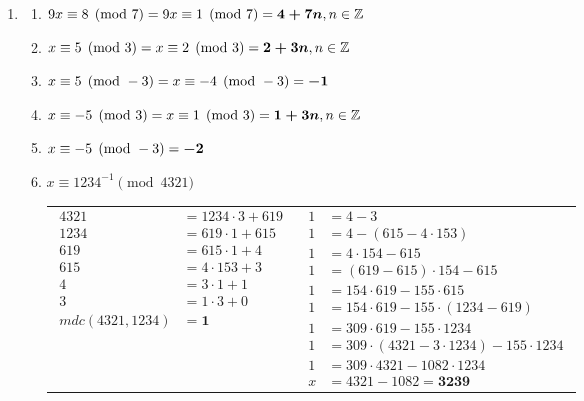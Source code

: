 \documentclass[fleqn]{article}
\begin{document}
\begin{enumerate}[label=\textbf{\arabic*})]
\begin{enumerate}
\end{enumerate}

\item

\begin{enumerate}

\item $9x \equiv 8 \pmod{7} \\
= 9x \equiv 1 \pmod{7} \\
= \boldsymbol{4 + 7n}, n \in \mathbb{Z}$

\item $x \equiv 5 \pmod{3} \\
= x \equiv 2 \pmod{3} \\
= \boldsymbol{2 + 3n}, n \in \mathbb{Z}$

\item $x \equiv 5 \pmod{-3} \\
= x \equiv -4 \pmod{-3} \\
= \boldsymbol{-1}$

\item $x \equiv -5 \pmod{3} \\
= x \equiv 1 \pmod{3} \\
= \boldsymbol{1 + 3n}, n \in \mathbb{Z}$

\item $x \equiv -5 \pmod{-3} \\
= \boldsymbol{-2}$

\item $x \equiv 1234^{-1} \pmod{4321}$

\begin{tabular}{*{2}{c}}
$\begin{aligned}
4321 &= 1234 \cdot 3 + 619 \\
1234 &= 619 \cdot 1 + 615 \\
619 &= 615 \cdot 1 + 4 \\
615 &= 4 \cdot 153 + 3 \\
4 &= 3 \cdot 1 + 1 \\
3 &= 1 \cdot 3 + 0 \\
mdc(4321, 1234) &= \boldsymbol{1}
\end{aligned}$ &
$\begin{aligned}
1 &= 4 - 3 \\
1 &= 4 - (615 - 4 \cdot 153) \\
1 &= 4 \cdot 154 - 615 \\
1 &= (619 - 615) \cdot 154 - 615 \\
1 &= 154 \cdot 619 - 155 \cdot 615 \\
1 &= 154 \cdot 619 - 155 \cdot (1234 - 619) \\
1 &= 309 \cdot 619 - 155 \cdot 1234 \\
1 &= 309 \cdot (4321 - 3 \cdot 1234) - 155 \cdot 1234 \\
1 &= 309 \cdot 4321 - 1082 \cdot 1234 \\
x &= 4321 - 1082 = \boldsymbol{3239}
\end{aligned}$
\end{tabular}


\end{enumerate}
\end{enumerate}
\end{document}
